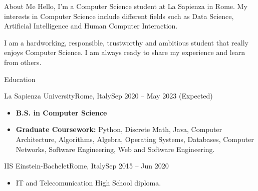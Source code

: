 \documentclass[]{mcdowellcv}
\begin{document}
	\makeheader
	
\begin{cvsection}{About Me}
	Hello, I'm a Computer Science student at La Sapienza in Rome. My interests in Computer Science include different fields such as Data Science, Artificial Intelligence and Human Computer Interaction.

	I am a hardworking, responsible, trustworthy and ambitious student that really enjoys Computer Science. I am always ready to share my experience and learn from others. 
	
\end{cvsection}
\begin{cvsection}{Education}
		\begin{cvsubsection}{La Sapienza University}{Rome, Italy}{Sep 2020 -- May 2023 (Expected)}
			\begin{itemize}
				\item \textbf{B.S. in Computer Science}
				\item \textbf{Graduate Coursework:} Python, Discrete Math, Java, Computer Architecture, Algorithms, Algebra, Operating Systems, Databases, Computer Networks, Software Engineering, Web and Software Engineering.
			\end{itemize}
		\end{cvsubsection}
		\begin{cvsubsection}{IIS Einstein-Bachelet}{Rome, Italy}{Sep 2015 -- Jun 2020}
			\begin{itemize}
				\item IT and Telecomunication High School diploma.
			\end{itemize}
		\end{cvsubsection}
	\end{cvsection}
\end{document}
